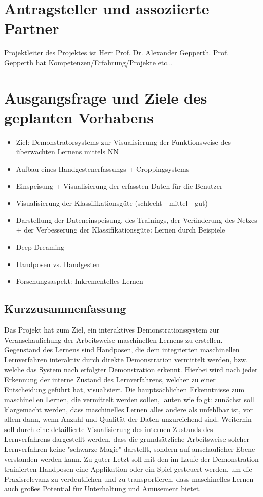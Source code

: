 \documentclass{article}
\begin{document}
\renewcommand{\thesection}{2}
\section{Antragsteller und assoziierte Partner}
Projektleiter des Projektes ist Herr Prof. Dr. Alexander Gepperth. Prof. Gepperth hat Kompetenzen/Erfahrung/Projekte etc...

\renewcommand{\thesection}{3}
\section{Ausgangsfrage und Ziele des geplanten Vorhabens}

\begin{itemize}
	\item Ziel: Demonstratorsystems zur Visualisierung der Funktionsweise des überwachten Lernens mittels NN
	\item Aufbau eines Handgestenerfassungs + Croppingsystems
	\item Einspeisung + Visualisierung der erfassten Daten für die Benutzer
	\item Visualisierung der Klassifikationsgüte (schlecht - mittel - gut)
	\item Darstellung der Dateneinspeisung, des Trainings, der Veränderung des Netzes + der Verbesserung der Klassifikationsgüte: Lernen durch Beispiele
	\item Deep Dreaming
	\item Handposen vs. Handgesten
	\item Forschungsaspekt: Inkrementelles Lernen

\end{itemize}


\subsection{Kurzzusammenfassung}
Das Projekt hat zum Ziel, ein interaktives Demonstrationssystem zur Veranschaulichung der Arbeitsweise maschinellen Lernens zu erstellen. 
Gegenstand des Lernens sind Handposen, die dem integrierten maschinellen Lernverfahren interaktiv durch direkte Demonstration vermittelt werden, bzw. welche das System nach
erfolgter Demonstration erkennt.  Hierbei wird nach jeder Erkennung der interne Zustand des Lernverfahrens, welcher zu einer Entscheidung geführt hat, visualisiert. 
Die hauptsächlichen Erkenntnisse zum maschinellen Lernen, die vermittelt werden sollen, lauten wie folgt: zunächst soll klargemacht werden, dass maschinelles Lernen alles andere als unfehlbar ist, vor allem dann, wenn Anzahl und Qualität der Daten unzureichend sind. Weiterhin soll durch eine detaillierte Visualisierung des internen Zustands des Lernverfahrens dargestellt werden, dass die grundsätzliche Arbeitsweise solcher Lernverfahren keine "schwarze Magie" darstellt, sondern auf anschaulicher Ebene  verstanden werden kann. 
Zu guter Letzt soll mit den im Laufe der Demonstration trainierten Handposen eine Applikation oder ein Spiel gesteuert werden, um die Praxisrelevanz zu verdeutlichen und zu transportieren, dass maschinelles Lernen auch großes Potential für Unterhaltung und Amüsement bietet. 
%
\end{document}
